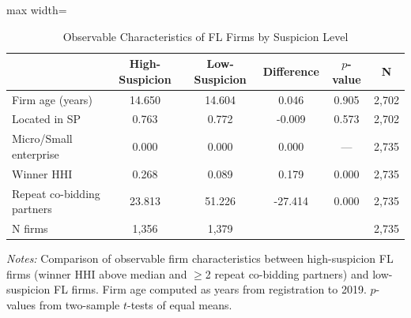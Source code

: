 \begin{table}[htbp]
\centering
\caption{Observable Characteristics of FL Firms by Suspicion Level}
\label{tab:fl_subgroup_chars}
\begin{adjustbox}{max width=\textwidth}
\begin{threeparttable}
\small
\begin{tabular}{lccccc}
\toprule
 & High-Suspicion & Low-Suspicion & Difference & $p$-value & N \\
\midrule
Firm age (years) & 14.650 & 14.604 & 0.046 & 0.905 & 2,702 \\
Located in SP & 0.763 & 0.772 & -0.009 & 0.573 & 2,702 \\
Micro/Small enterprise & 0.000 & 0.000 & 0.000 & --- & 2,735 \\
Winner HHI & 0.268 & 0.089 & 0.179 & 0.000 & 2,735 \\
Repeat co-bidding partners & 23.813 & 51.226 & -27.414 & 0.000 & 2,735 \\
\midrule
N firms & 1,356 & 1,379 & & & 2,735 \\
\bottomrule
\end{tabular}
\begin{tablenotes}
\small
\item \textit{Notes:} Comparison of observable firm characteristics between
high-suspicion FL firms (winner HHI above median and $\geq$2 repeat co-bidding partners)
and low-suspicion FL firms. Firm age computed as years from registration to 2019.
$p$-values from two-sample $t$-tests of equal means.
\end{tablenotes}
\end{threeparttable}
\end{adjustbox}
\end{table}
